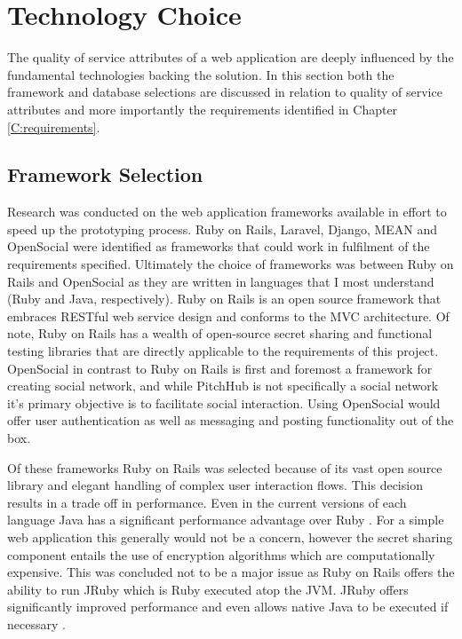 \section{Technology Choice}

The quality of service attributes of a web application are deeply influenced by the fundamental technologies backing the solution. In this section both the framework and database selections are discussed in relation to quality of service attributes and more importantly the requirements identified in Chapter \ref{C:requirements}.

\subsection{Framework Selection}\label{SS:frameworkSelection}

Research was conducted on the web application frameworks available in effort to speed up the prototyping process. Ruby on Rails, Laravel, Django, MEAN and OpenSocial were identified as frameworks that could work in fulfilment of the requirements specified. Ultimately the choice of frameworks was between Ruby on Rails and OpenSocial as they are written in languages that I most understand (Ruby and Java, respectively). Ruby on Rails is an open source framework that embraces RESTful web service design and conforms to the MVC architecture. Of note, Ruby on Rails has a wealth of open-source secret sharing and functional testing libraries that are directly applicable to the requirements of this project. OpenSocial in contrast to Ruby on Rails is first and foremost a framework for creating social network, and while PitchHub is not specifically a social network it's primary objective is to facilitate social interaction. Using OpenSocial would offer user authentication as well as messaging and posting functionality out of the box. 
\par
Of these frameworks Ruby on Rails was selected because of its vast open source library and elegant handling of complex user interaction flows. This decision results in a trade off in performance. Even in the current versions of each language Java has a significant  performance advantage over Ruby \cite{Perfo1:online}. For a simple web application this generally would not be a concern, however the secret sharing component entails the use of encryption algorithms which are computationally expensive. This was concluded not to be a major issue as Ruby on Rails offers the ability to run JRuby which is Ruby executed atop the JVM. JRuby offers significantly improved performance and even allows native Java to be executed if necessary \cite{Jruby:online}.

